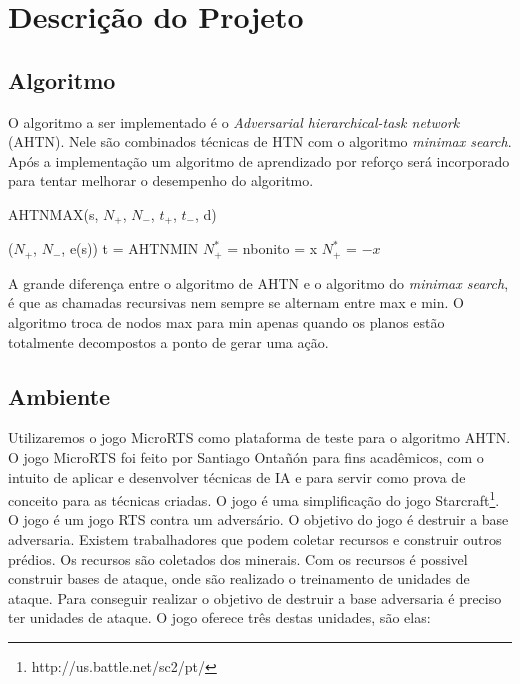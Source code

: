\chapter{\label{chap:descr}Descrição do Projeto}

\section{Algoritmo}
O algoritmo a ser implementado é o \textit{Adversarial hierarchical-task network} (AHTN). Nele são combinados técnicas de HTN com o algoritmo \textit{minimax search}. Após a implementação um algoritmo de aprendizado por reforço será incorporado para tentar melhorar o desempenho do algoritmo. %

\begin{algorithm}
	\caption{AHTNMAX(s, $N_{+}$, $N_{-}$, $t_{+}$, $t_{-}$, d)}
	\begin{algorithmic}[1]
		\State	\Return ($N_{+}$, $N_{-}$, e(s))
		\EndIf
		\If {}
		\State t = 
		\State \Return AHTNMIN
		\EndIf
		\State $N_{+}^{*}$ = 
		\State nbonito = 
		\ForAll{}
		\State x
		\If{}
		\State $N_{+}^{*}$ = 
		\EndIf
		\EndFor		
		\State \Return $-x$
	\end{algorithmic}
\end{algorithm}


A grande diferença entre o algoritmo de AHTN e o algoritmo do \textit{minimax search}, é que as chamadas recursivas nem sempre se alternam entre max e min. O algoritmo troca de nodos max para min apenas quando os planos estão totalmente decompostos a ponto de gerar uma ação. 

\section{Ambiente}

Utilizaremos o jogo MicroRTS como plataforma de teste para o algoritmo AHTN. O jogo MicroRTS foi feito por Santiago Ontañón \cite{ontanon2013combinatorial} para fins acadêmicos, com o intuito de aplicar e desenvolver técnicas de IA e para servir como prova de conceito para as técnicas criadas.  
O jogo é uma simplificação do jogo Starcraft\footnote{http://us.battle.net/sc2/pt/}. O jogo é um jogo RTS contra um adversário. O objetivo do jogo é destruir a base adversaria. Existem trabalhadores que podem coletar recursos e construir outros prédios. Os recursos são coletados dos minerais. Com os recursos é possivel construir bases de ataque, onde são realizado o treinamento de unidades de ataque. Para conseguir realizar o objetivo de destruir a base adversaria é preciso ter unidades de ataque. O jogo oferece três destas unidades, são elas:

